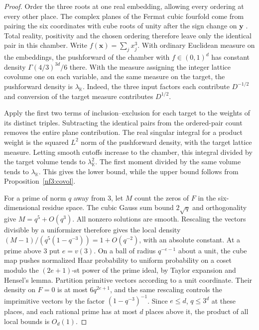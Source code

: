 \documentclass[11pt,letterpaper]{article}
\theoremstyle{definition}
\numberwithin{equation}{section}
\begin{document}
\begin{proof}
Order the three roots at one real embedding, allowing every ordering
at every other place. The complex planes of the Fermat cubic fourfold
come from pairing the six coordinates with cube roots of unity after
the sign change on $\mathbf y$ \cite[Sect.~2.5]{nf3:dio}. Total reality,
positivity and the chosen ordering therefore leave only the identical
pair in this chamber. Write $f(\mathbf x)=\sum_j x_j^3$.
With ordinary Euclidean measure on the embeddings, the pushforward of
the chamber with $f\in(0,1)^d$ has constant density
$\Gamma(4/3)^{3d}/6$ there. With the measure assigning the integer
lattice covolume one on each variable, and the same measure on the
target, the pushforward density is $\lambda_{\mathbb K}$. Indeed, the
three input factors each contribute $D^{-1/2}$ and conversion of the
target measure contributes $D^{1/2}$.

Apply the first two terms of inclusion--exclusion for each target to the
weights of its distinct triples. Subtracting the identical pairs from the
ordered-pair count removes the entire plane contribution. The real
singular integral for a product weight is the squared $L^2$ norm of
the pushforward density, with the target lattice measure. Letting smooth
cutoffs increase to the chamber, this integral divided by the target
volume tends to $\lambda_{\mathbb K}^2$. The first moment divided by the
same volume tends to $\lambda_{\mathbb K}$. This gives the lower bound, while the upper bound follows from Proposition~\ref{nf3:covol}.

For a prime of norm $q$ away from $3$, let $M$ count the zeros of $F$
in the six-dimensional residue space. The cubic Gauss sum bound
$2\sqrt q$ and orthogonality give $M=q^5+O(q^3)$. All nonzero solutions
are smooth. Rescaling the vectors divisible by a uniformizer therefore
gives the local density $(M-1)/(q^5(1-q^{-3}))=1+O(q^{-2})$, with an
absolute constant. At a prime above $3$ put $e=v(3)$. On a ball of radius
$q^{-e-1}$ about a unit, the cube map pushes normalized Haar probability
to uniform probability on a coset modulo the $(2e+1)$-st power of the
prime ideal, by Taylor expansion and Hensel's lemma. Partition primitive
vectors according to a unit coordinate. Their density on $F=0$ is at
most $6q^{2e+1}$, and the same rescaling controls the imprimitive
vectors by the factor $(1-q^{-3})^{-1}$. Since $e\le d$, $q\le3^d$ at
these places, and each rational prime has at most $d$ places above it,
the product of all local bounds is $O_d(1)$.
\end{proof}
\end{document}
